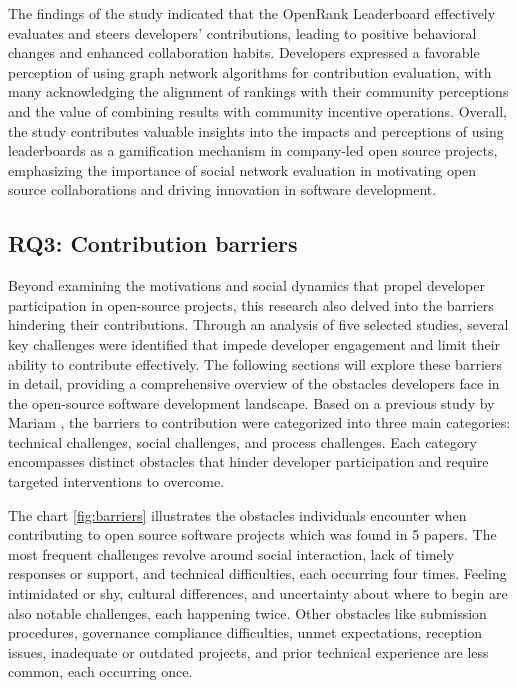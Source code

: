 The findings of the study indicated that the OpenRank Leaderboard effectively evaluates and steers developers' contributions, leading to positive behavioral changes and enhanced collaboration habits. Developers expressed a favorable perception of using graph network algorithms for contribution evaluation, with many acknowledging the alignment of rankings with their community perceptions and the value of combining results with community incentive operations. Overall, the study contributes valuable insights into the impacts and perceptions of using leaderboards as a gamification mechanism in company-led open source projects, emphasizing the importance of social network evaluation in motivating open source collaborations and driving innovation in software development.


\subsection{RQ3: Contribution barriers}

Beyond examining the motivations and social dynamics that propel developer participation in open-source projects, this research also delved into the barriers hindering their contributions. Through an analysis of five selected studies, several key challenges were identified that impede developer engagement and limit their ability to contribute effectively. The following sections will explore these barriers in detail, providing a comprehensive overview of the obstacles developers face in the open-source software development landscape. Based on a previous study by Mariam \cite{04guizani2021long}, the barriers to contribution were categorized into three main categories: technical challenges, social challenges, and process challenges. Each category encompasses distinct obstacles that hinder developer participation and require targeted interventions to overcome.


The chart \ref{fig:barriers} illustrates the obstacles individuals encounter when contributing to open source software projects which was found in 5 papers. The most frequent challenges revolve around social interaction, lack of timely responses or support, and technical difficulties, each occurring four times. Feeling intimidated or shy, cultural differences, and uncertainty about where to begin are also notable challenges, each happening twice. Other obstacles like submission procedures, governance compliance difficulties, unmet expectations, reception issues, inadequate or outdated projects, and prior technical experience are less common, each occurring once.

